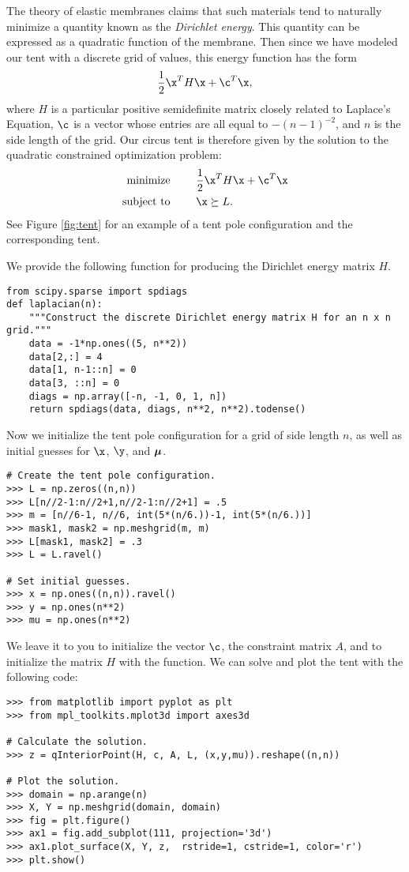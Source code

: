 The theory of elastic membranes claims that such materials tend to naturally minimize a quantity known as the \emph{Dirichlet energy}.
This quantity can be expressed as a quadratic function of the membrane.
Then since we have modeled our tent with a discrete grid of values, this energy function has the form \[\frac{1}{2}\x^T H \x + \c^T \x,\] where $H$ is a particular positive semidefinite matrix closely related to Laplace's Equation, $\c$ is a vector whose entries are all equal to $-(n-1)^{-2}$, and $n$ is the side length of the grid.
Our circus tent is therefore given by the solution to the quadratic constrained optimization problem:
\begin{align*}
\text{minimize }\qquad &\frac{1}{2}\x^T H \x + \c^T \x\\
\text{subject to }\qquad &\x \succeq L.\\
\end{align*}
See Figure \ref{fig:tent} for an example of a tent pole configuration and the corresponding tent.

We provide the following function for producing the Dirichlet energy matrix $H$.
\begin{lstlisting}
from scipy.sparse import spdiags
def laplacian(n):
    """Construct the discrete Dirichlet energy matrix H for an n x n grid."""
    data = -1*np.ones((5, n**2))
    data[2,:] = 4
    data[1, n-1::n] = 0
    data[3, ::n] = 0
    diags = np.array([-n, -1, 0, 1, n])
    return spdiags(data, diags, n**2, n**2).todense()
\end{lstlisting}
Now we initialize the tent pole configuration for a grid of side length $n$, as well as initial guesses for $\x$, $\y$, and $\boldsymbol{\mu}$.
\begin{lstlisting}
# Create the tent pole configuration.
>>> L = np.zeros((n,n))
>>> L[n//2-1:n//2+1,n//2-1:n//2+1] = .5
>>> m = [n//6-1, n//6, int(5*(n/6.))-1, int(5*(n/6.))]
>>> mask1, mask2 = np.meshgrid(m, m)
>>> L[mask1, mask2] = .3
>>> L = L.ravel()

# Set initial guesses.
>>> x = np.ones((n,n)).ravel()
>>> y = np.ones(n**2)
>>> mu = np.ones(n**2)
\end{lstlisting}
We leave it to you to initialize the vector $\c$, the constraint matrix $A$,
and to initialize the matrix $H$ with the  function.
We can solve and plot the tent with the following code:
\begin{lstlisting}
>>> from matplotlib import pyplot as plt
>>> from mpl_toolkits.mplot3d import axes3d

# Calculate the solution.
>>> z = qInteriorPoint(H, c, A, L, (x,y,mu)).reshape((n,n))

# Plot the solution.
>>> domain = np.arange(n)
>>> X, Y = np.meshgrid(domain, domain)
>>> fig = plt.figure()
>>> ax1 = fig.add_subplot(111, projection='3d')
>>> ax1.plot_surface(X, Y, z,  rstride=1, cstride=1, color='r')
>>> plt.show()
\end{lstlisting}

